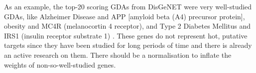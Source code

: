 As an example, the top-20 scoring GDAs from DisGeNET were
very well-studied GDAs, like Alzheimer Disease and APP [amyloid beta (A4) precursor protein], obesity and MC4R (melanocortin 4 receptor), and Type 2 Diabetes Mellitus and IRS1 (insulin receptor substrate 1) \cite{DisGeNET2015}. These genes do not represent hot, putative targets since they have been studied for long periods of time and there is already an active research on them. There should be a normalisation to inflate the weights of non-so-well-studied genes.